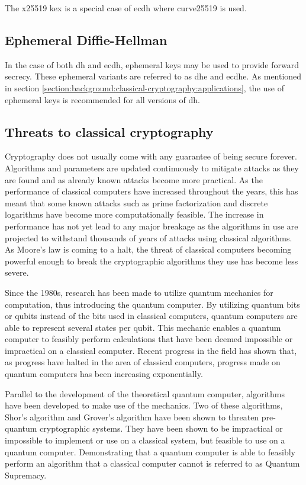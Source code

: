 The \gls{x25519} \gls{kex} is a special case of \gls{ecdh} where \gls{curve25519} is used\cite{rfc7748}. 

\subsection{Ephemeral Diffie-Hellman}

In the case of both \gls{dh} and \gls{ecdh}, ephemeral keys may be used to provide forward secrecy. These ephemeral variants are referred to as \gls{dhe} and \gls{ecdhe}. As mentioned in section \ref{section:background:classical-cryptography:applications}, the use of ephemeral keys is recommended for all versions of \gls{dh}.

\subsection{Threats to classical cryptography}

Cryptography does not usually come with any guarantee of being secure forever. Algorithms and parameters are updated continuously to mitigate attacks as they are found and as already known attacks become more practical\cite{nist2019}. As the performance of classical computers have increased throughout the years, this has meant that some known attacks such as prime factorization and discrete logarithms have become more computationally feasible. The increase in performance has not yet lead to any major breakage as the algorithms in use are projected to withstand thousands of years of attacks using classical algorithms\cite{thome2019}. As Moore's law is coming to a halt\cite{theis2017}, the threat of classical computers becoming powerful enough to break the cryptographic algorithms they use has become less severe.

Since the 1980s, research has been made to utilize quantum mechanics for computation, thus introducing the quantum computer\cite{benioff1980}. By utilizing quantum bits or \glspl{qubit} instead of the bits used in classical computers, quantum computers are able to represent several states per \gls{qubit}. This mechanic enables a quantum computer to feasibly perform calculations that have been deemed impossible or impractical on a classical computer\cite{jordan2021}. Recent progress in the field has shown that, as progress have halted in the area of classical computers, progress made on quantum computers has been increasing exponentially\cite{ibm2020:quantum-computer}.

Parallel to the development of the theoretical quantum computer, algorithms have been developed to make use of the mechanics. Two of these algorithms, Shor's algorithm and Grover's algorithm have been shown to threaten pre-quantum cryptographic systems. They have been shown to be impractical or impossible to implement or use on a classical system, but feasible to use on a quantum computer\cite{shor1997, jordan2021}. Demonstrating that a quantum computer is able to feasibly perform an algorithm that a classical computer cannot is referred to as Quantum Supremacy\cite{farhi2019}.

